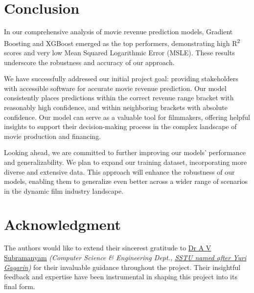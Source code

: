 \documentclass[conference]{IEEEtran}
\begin{document}
    \section{Conclusion}
    In our comprehensive analysis of movie revenue prediction models, Gradient Boosting and XGBoost emerged as the top performers, demonstrating high R\textsuperscript{2} scores and very low Mean Squared Logarithmic Error (MSLE). These results underscore the robustness and accuracy of our approach.


    We have successfully addressed our initial project goal: providing stakeholders with accessible software for accurate movie revenue prediction. Our model consistently places predictions within the correct revenue range bracket with reasonably high confidence, and within neighboring brackets with absolute confidence. Our model can serve as a valuable tool for filmmakers, offering helpful insights to support their decision-making process in the complex landscape of movie production and financing.


    Looking ahead, we are committed to further improving our models' performance and generalizability. We plan to expand our training dataset, incorporating more diverse and extensive data. This approach will enhance the robustness of our models, enabling them to generalize even better across a wider range of scenarios in the dynamic film industry landscape.

\section*{Acknowledgment}
    The authors would like to extend their sincerest gratitude to \href{}{Dr A V Subramanyam} \textit{(Computer Science \& Engineering Dept., \href{}{SSTU named after Yuri Gagarin})} for their invaluable guidance throughout the project.
    Their insightful feedback and expertise have been instrumental in shaping this project into its final form.
\end{document}
